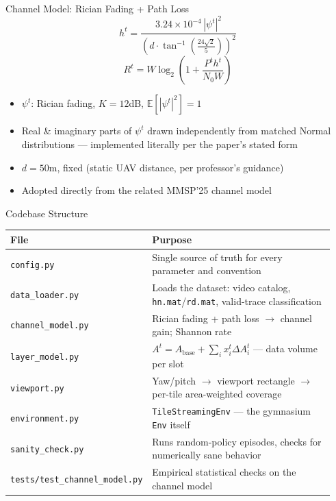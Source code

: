 \documentclass[aspectratio=169]{beamer}
\begin{document}
\begin{frame}{Channel Model: Rician Fading + Path Loss}
  \[ h^t = \frac{3.24\times10^{-4}\,|\psi^t|^2}{\left(d\cdot\tan^{-1}\!\left(\frac{24\sqrt2}{5}\right)\right)^2} \]
  \[ R^t = W\log_2\!\left(1+\frac{P^t h^t}{N_0 W}\right) \]

  \begin{itemize}
    \item $\psi^t$: Rician fading, $K{=}12$dB, $\mathbb{E}[|\psi^t|^2]{=}1$
    \item Real \& imaginary parts of $\psi^t$ drawn independently from matched Normal distributions --- implemented literally per the paper's stated form
    \item $d{=}50$m, fixed (static UAV distance, per professor's guidance)
    \item Adopted directly from the related MMSP'25 channel model
  \end{itemize}
\end{frame}

\begin{frame}{Codebase Structure}
  \scriptsize
  \begin{tabular}{@{}>{\raggedright\arraybackslash}p{0.30\linewidth}>{\raggedright\arraybackslash}p{0.64\linewidth}@{}}
    \toprule
    \textbf{File} & \textbf{Purpose} \\
    \midrule
    \texttt{config.py} & Single source of truth for every parameter and convention \\
    \texttt{data\_loader.py} & Loads the dataset: video catalog, \texttt{hn.mat}/\texttt{rd.mat}, valid-trace classification \\
    \texttt{channel\_model.py} & Rician fading + path loss $\to$ channel gain; Shannon rate \\
    \texttt{layer\_model.py} & $A^t = A_{\text{base}} + \sum_i x_i^t \Delta A_i^t$ --- data volume per slot \\
    \texttt{viewport.py} & Yaw/pitch $\to$ viewport rectangle $\to$ per-tile area-weighted coverage \\
    \texttt{environment.py} & \texttt{TileStreamingEnv} --- the gymnasium \texttt{Env} itself \\
    \texttt{sanity\_check.py} & Runs random-policy episodes, checks for numerically sane behavior \\
    \texttt{tests/test\_channel\_model.py} & Empirical statistical checks on the channel model \\
    \bottomrule
  \end{tabular}
\end{frame}
\end{document}
